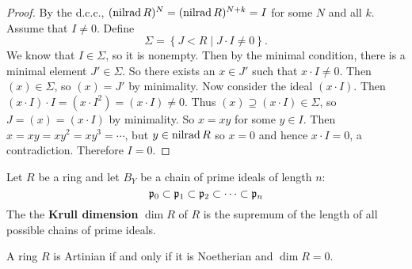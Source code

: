 \begin{proof}
  By the d.c.c.\@, $(\operatorname{nilrad} R)^N=(\operatorname{nilrad} R)^{N+k}=I$ for some $N$ and all $k$.
  Assume that $I \neq 0$.
  Define
  \[ \Sigma = \left\{ J < R \mid J \cdot I \neq 0 \right\}. \]
  We know that $I \in \Sigma$, so it is nonempty.
  Then by the minimal condition, there is a minimal element $J' \in \Sigma$.
  So there exists an $x \in J'$ such that $x \cdot I \neq 0$.
  Then $(x) \in \Sigma$, so $(x)=J'$ by minimality.
  Now consider the ideal $(x \cdot I)$.
  Then $(x \cdot I) \cdot I = (x \cdot I^2) = (x \cdot I) \neq 0$.
  Thus $(x) \supseteq (x \cdot I) \in \Sigma$, so $J = (x) = (x \cdot I)$ by minimality.
  So $x=xy$ for some $y \in I$.
  Then $x=xy=xy^2=xy^3=\cdots$, but $y \in \operatorname{nilrad} R$ so $x=0$ and hence $x \cdot I = 0$, a contradiction.
  Therefore $I=0$.
\end{proof}

\begin{defn}[3.35]
  Let $R$ be a ring and let $B_Y$ be a chain of prime ideals of length $n$:
  \[ \mathfrak{p}_0 \subset \mathfrak{p}_1 \subset \mathfrak{p}_2 \subset \cdots \subset \mathfrak{p}_n \]
  The the \textbf{Krull dimension} $\dim R$ of $R$ is the supremum of the length of all possible chains of prime ideals.
\end{defn}

\begin{thm}[3.36]
  A ring $R$ is Artinian if and only if it is Noetherian and $\dim R=0$.
\end{thm}
